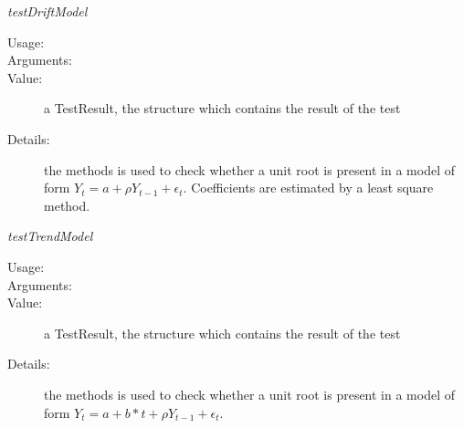 \begin{description}
\begin{description}
\item \textit{testDriftModel}
\begin{description}
\item[Usage:] \rule{0pt}{1em}
\item[Arguments:] \rule{0pt}{1em}
\item[Value:]  a TestResult, the structure which contains the result of the test
\item[Details:] the methods is used to check whether a unit root is present in a model of form $Y_t = a + \rho Y_{t-1} + \epsilon_t$.
Coefficients are estimated by a least square method.
\end{description}
\bigskip

\item \textit{testTrendModel}
\begin{description}
\item[Usage:] \rule{0pt}{1em}
\item[Arguments:] \rule{0pt}{1em}
\item[Value:]  a TestResult, the structure which contains the result of the test
\item[Details:] the methods is used to check whether a unit root is present in a model of form $Y_t = a + b* t + \rho Y_{t-1} + \epsilon_t$.
\end{description}
\bigskip


\end{description}
\end{description}
